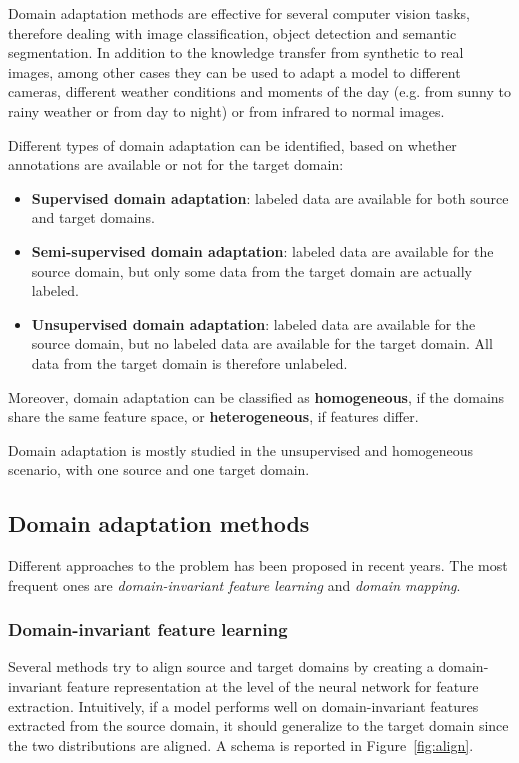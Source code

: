 \documentclass[%
    corpo=12pt,
    twoside,
    stile=classica,   
    tipotesi=magistrale,
    evenboxes,
    english,
	numerazioneromana,
]{toptesi}
\begin{document}
\bigskip
Domain adaptation methods are effective for several computer vision tasks, therefore dealing with image classification, object detection and semantic segmentation. In addition to the knowledge transfer from synthetic to real images, among other cases they can be used to adapt a model to different cameras, different weather conditions and moments of the day (e.g. from sunny to rainy weather or from day to night) or from infrared to normal images.

Different types of domain adaptation can be identified, based on whether annotations are available or not for the target domain:

\begin{itemize}
	\item \textbf{Supervised domain adaptation}: labeled data are available for both source and target domains.
	\item \textbf{Semi-supervised domain adaptation}: labeled data are available for the source domain, but only some data from the target domain are actually labeled.
	\item \textbf{Unsupervised domain adaptation}: labeled data are available for the source domain, but no labeled data are available for the target domain. All data from the target domain is therefore unlabeled.
\end{itemize}
Moreover, domain adaptation can be classified as \textbf{homogeneous}, if the domains share the same feature space, or \textbf{heterogeneous}, if features differ.

\medskip
Domain adaptation is mostly studied in the unsupervised and homogeneous scenario, with one source and one target domain.

\subsection{Domain adaptation methods}
Different approaches to the problem has been proposed in recent years. The most frequent ones are \textit{domain-invariant feature learning} and \textit{domain mapping}.

\subsubsection{Domain-invariant feature learning}
Several methods try to align source and target domains by creating a domain-invariant feature representation at the level of the neural network for feature extraction. Intuitively, if a model performs well on domain-invariant features extracted from the source domain, it should generalize to the target domain since the two distributions are aligned. A schema is reported in Figure~\ref{fig:align}.
\end{document}
